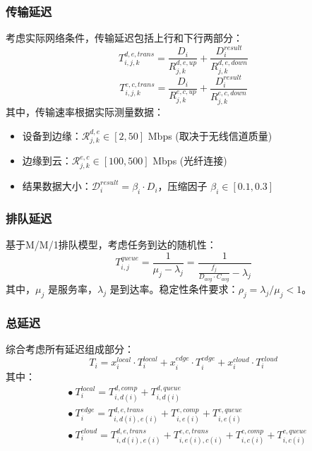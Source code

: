 \documentclass[conference]{IEEEtran}
\begin{document}
\subsubsection{传输延迟}
考虑实际网络条件，传输延迟包括上行和下行两部分：
\begin{equation}
T_{i,j,k}^{d,e,trans} = \frac{D_i}{R_{j,k}^{d,e,up}} + \frac{D_i^{result}}{R_{j,k}^{d,e,down}}
\end{equation}
\begin{equation}
T_{i,j,k}^{e,c,trans} = \frac{D_i}{R_{j,k}^{e,c,up}} + \frac{D_i^{result}}{R_{j,k}^{e,c,down}}
\end{equation}
其中，传输速率根据实际测量数据：
\begin{itemize}
    \item 设备到边缘：$\mathcal{R}_{j,k}^{d,e} \in [2, 50]$ Mbps (取决于无线信道质量)
    \item 边缘到云：$\mathcal{R}_{j,k}^{e,c} \in [100, 500]$ Mbps (光纤连接)
    \item 结果数据大小：$\mathcal{D}_{i}^{result} = {\beta}_{i}​⋅{D}_{i} $，压缩因子 $\mathcal{\beta}_i \in [0.1, 0.3]$
\end{itemize}
\subsubsection{排队延迟}
基于M/M/1排队模型，考虑任务到达的随机性：
\begin{equation}
T_{i,j}^{queue} = \frac{1}{\mu_j - \lambda_j} = \frac{1}{\frac{f_j}{D_{avg} \cdot C_{avg}} - \lambda_j}
\end{equation}
其中，$\mathcal{\mu}_{j}$ 是服务率，$\mathcal{\lambda}_{j}$ 是到达率。稳定性条件要求：$\mathcal{\rho}_{j} = {\lambda}_{j} / {\mu}_{j} < 1$。
\subsubsection{总延迟}
综合考虑所有延迟组成部分：
\begin{equation}
T_i = x_{i}^{local} \cdot T_i^{local} + x_{i}^{edge} \cdot T_i^{edge} + x_{i}^{cloud} \cdot T_i^{cloud}
\end{equation}
其中：
\begin{equation}
\begin{aligned}
    &\bullet \ T^{local}_i = T^{d, comp}_{i, d(i)} + T^{d, queue}_{i, d(i)} \\
    &\bullet \ T^{edge}_i = T^{d, e, trans}_{i, d(i), e(i)} + T^{e, comp}_{i, e(i)} + T^{e, queue}_{i, e(i)} \\
    &\bullet \ T^{cloud}_i = T^{d, e, trans}_{i, d(i), e(i)} + T^{e, c, trans}_{i, e(i), c(i)} + T^{c, comp}_{i, c(i)} + T^{c, queue}_{i, c(i)}
\end{aligned}
\end{equation}
\end{document}
